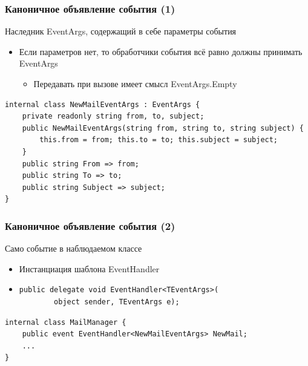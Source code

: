 \documentclass[xetex,mathserif,serif]{beamer}
\begin{document}
    \begin{frame}[fragile]
        \frametitle{Каноничное объявление события (1)}
        Наследник EventArgs, содержащий в себе параметры события
        \begin{itemize}
            \item Если параметров нет, то обработчики события всё равно должны принимать EventArgs
            \begin{itemize}
                \item Передавать при вызове имеет смысл EventArgs.Empty
            \end{itemize}
        \end{itemize}

        \vspace{3mm}
        \begin{verbatim}
internal class NewMailEventArgs : EventArgs {
    private readonly string from, to, subject;
    public NewMailEventArgs(string from, string to, string subject) {
        this.from = from; this.to = to; this.subject = subject;
    }
    public string From => from;
    public string To => to;
    public string Subject => subject;
}
        \end{verbatim}
    \end{frame}

    \begin{frame}[fragile]
        \frametitle{Каноничное объявление события (2)}
        Само событие в наблюдаемом классе
        \begin{itemize}
            \item Инстанциация шаблона EventHandler
            \item 
                \begin{verbatim}
public delegate void EventHandler<TEventArgs>(
        object sender, TEventArgs e);
                \end{verbatim}
        \end{itemize}

        \vspace{7mm}
        \begin{verbatim}
internal class MailManager {
    public event EventHandler<NewMailEventArgs> NewMail;
    ...
}
        \end{verbatim}
    \end{frame}
\end{document}
